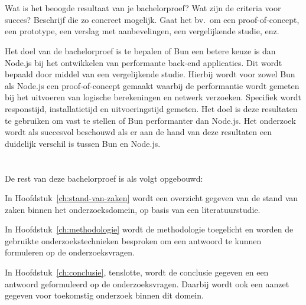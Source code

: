 \section{}%
\label{sec:onderzoeksdoelstelling}

Wat is het beoogde resultaat van je bachelorproef? 
Wat zijn de criteria voor succes? Beschrijf die zo concreet mogelijk.
Gaat het bv.\ om een proof-of-concept, een prototype, een verslag met aanbevelingen, een vergelijkende studie, enz.

Het doel van de bachelorproef is te bepalen of Bun een betere keuze is dan Node.js bij het
ontwikkelen van performante back-end applicaties. Dit wordt bepaald door middel van een vergelijkende studie.
Hierbij wordt voor zowel Bun als Node.js een proof-of-concept gemaakt waarbij de performantie wordt gemeten bij het uitvoeren van logische berekeningen 
en netwerk verzoeken. Specifiek wordt responstijd, installatietijd en uitvoeringstijd gemeten. 
Het doel is deze resultaten te gebruiken om vast te stellen of Bun performanter dan Node.js. 
Het onderzoek wordt als succesvol beschouwd als er aan de hand van deze resultaten een duidelijk verschil is tussen Bun en Node.js.
\section{}%
\label{sec:opzet-bachelorproef}


De rest van deze bachelorproef is als volgt opgebouwd:

In Hoofdstuk~\ref{ch:stand-van-zaken} wordt een overzicht gegeven van de stand van zaken binnen het onderzoeksdomein,
 op basis van een literatuurstudie.

In Hoofdstuk~\ref{ch:methodologie} wordt de methodologie toegelicht en worden de gebruikte onderzoekstechnieken besproken om een antwoord te kunnen formuleren 
op de onderzoeksvragen.


In Hoofdstuk~\ref{ch:conclusie}, tenslotte, 
wordt de conclusie gegeven en een antwoord geformuleerd op de onderzoeksvragen. 
Daarbij wordt ook een aanzet gegeven voor toekomstig onderzoek binnen dit domein.